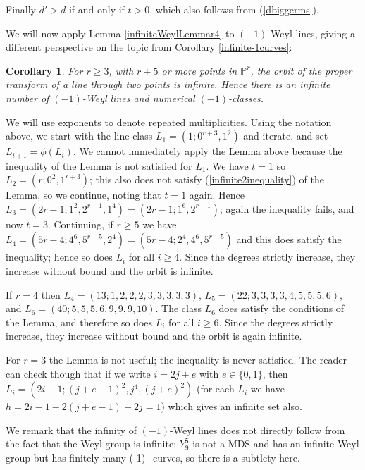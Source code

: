 \documentclass[12pt]{article}
\newtheorem{corollary}[equation]{Corollary}
\numberwithin{equation}{section}
\numberwithin{subeq}{equation}
\def\bbP{\mathbb{P}}
\begin{document}
Finally $d'>d$ if and only if $t > 0$, which also follows from (\ref{dbiggerms}).




 We will now apply Lemma \ref{infiniteWeylLemmar4} to $(-1)$-Weyl lines,
giving a different perspective on the topic from Corollary \ref{infinite-1curves}:

\begin{corollary}\label{infrigid}
For $r\geq 3$, with $r+5$ or more points in $\bbP^r$,
the orbit of the proper transform of a line through two points is infinite.
Hence there is an infinite number of $(-1)$-Weyl lines and numerical $(-1)$-classes.
\end{corollary}

\medskip{}
We will use exponents to denote repeated multiplicities.
Using the notation above, we start with the line class $L_1 = (1;0^{r+3},1^2)$ and iterate,
and set $L_{i+1}=\phi(L_i)$.
We cannot immediately apply the Lemma above
because the inequality of the Lemma is not satisfied for $L_1$.
We have $t=1$ so $L_2 = (r;0^2,1^{r+3})$;
this also does not satisfy (\ref{infinite2inequality}) of the Lemma,
so we continue, noting that $t=1$ again.
Hence $L_3=(2r-1;1^2,2^{r-1},1^4) = (2r-1;1^6,2^{r-1})$;
again the inequality fails, and now $t=3$.
Continuing, if $r\geq 5$ we have
$L_4=(5r-4; 4^6, 5^{r-5}, 2^{4}) = (5r-4; 2^4,4^6, 5^{r-5} )$
and this does satisfy the inequality;
hence so does $L_i$ for all $i \geq 4$.
 Since the degrees strictly increase,
they increase without bound and the orbit is infinite.

If $r=4$ then $L_4=(13;1,2,2,2,3,3,3,3,3)$,
$L_5=(22;3,3,3,3,4,5,5,5,6)$, and
$L_6=(40;5,5,5,6,9,9,9,10)$.
The class $L_6$ does satisfy the conditions of the Lemma,
and therefore so does $L_i$ for all $i\geq 6$.
Since the degrees strictly increase,
they increase without bound and the orbit is again infinite.

For $r=3$ the Lemma is not useful; the inequality is never satisfied.
The reader can check though that if we write $i = 2j+e$ with $e\in\{0,1\}$, then
$L_i = (2i-1;(j+e-1)^2,j^4,(j+e)^2)$ 
(for each $L_i$ we have $h=2i-1-2(j+e-1)-2j = 1$)
which gives an infinite set also.


We remark that the infinity of $(-1)$-Weyl lines does not directly follow from the fact that the Weyl group is infinite: $Y^5_9$ is not a MDS and has an infinite Weyl group
but has finitely many (-1)$-$curves,
so there is a subtlety here.
\end{document}
